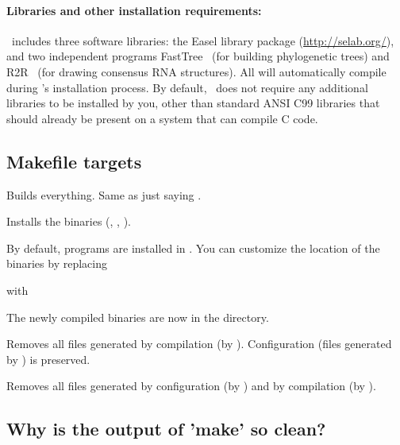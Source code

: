 \paragraph{Libraries and other installation requirements:} \rscape\ includes
three software libraries: the Easel library package
(\url{http://selab.org/}), and two independent programs
FastTree~\citep{Price10} (for building phylogenetic trees) and
R2R~\citep{WeinbergBreaker11} (for drawing consensus RNA
structures). All will automatically compile during \rscape's
installation process.  By default, \rscape\ does not require any
additional libraries to be installed by you, other than standard ANSI
C99 libraries that should already be present on a system that can
compile C code.

\subsection{Makefile targets}

\begin{sreitems}{}

\item[\emprog{all}]
  Builds everything. Same as just saying .

\item[\emprog{install}] 
  Installs the binaries (, , ).

  By default, programs are installed in
  . 
  You can customize the location of the binaries by replacing
  
  
  with
  
  
  The newly compiled binaries are now in the
   directory.\\
  
\item[\emprog{clean}]
  Removes all files generated by compilation (by
  ). Configuration (files generated by
  ) is preserved.

\item[\emprog{distclean}]
  Removes all files generated by configuration (by )
  and by compilation (by ). 

\end{sreitems}

\subsection{Why is the output of 'make' so clean?}

